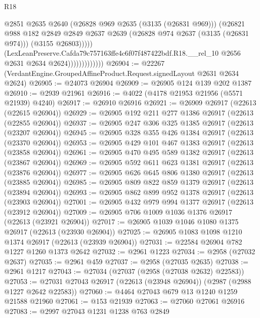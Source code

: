 \begin{lexlean}{R18}
\begin{coremodule}
                                  @2851
                                  @2635
                                  @2640
                                  (@26828 @969 @2635 (@3135 (@26831 @969)))
                                  (@26821
                                    @988
                                    @182
                                    @2849
                                    @2849
                                    @2637
                                    @2639
                                    (@26828 @974 @2637 (@3135 (@26831 @974)))
                                    (@3155 @26803)))))
                            (LexLeanPreserve.Cafda79c757163ffe4c6f07f487422bdf.R18.__rel_10
                              @2656
                              @2631
                              @2634
                              @2624)))))))))))))
@26904 := @22267 (VerdantEngine.GroupedAffineProduct.Request.signedLayout @2631 @2634 @2624)
@26905 := @24073 @26904
@26909 := @26905 @124 @139 @202 @1387
@26910 := @2939 @21961
@26916 := @4022 (@4178 @21953 @21956 (@5571 @21939) @4240)
@26917 := @26910 @26916
@26921 := @26909 @26917 (@22613 (@22615 @26904))
@26929 := @26905 @192 @211 @277 @1386 @26917 (@22613 (@22855 @26904))
@26937 := @26905 @247 @306 @325 @1385 @26917 (@22613 (@23207 @26904))
@26945 := @26905 @328 @355 @426 @1384 @26917 (@22613 (@23370 @26904))
@26953 := @26905 @429 @101 @467 @1383 @26917 (@22613 (@23858 @26904))
@26961 := @26905 @470 @495 @589 @1382 @26917 (@22613 (@23867 @26904))
@26969 := @26905 @592 @611 @623 @1381 @26917 (@22613 (@23876 @26904))
@26977 := @26905 @626 @645 @806 @1380 @26917 (@22613 (@23885 @26904))
@26985 := @26905 @809 @822 @859 @1379 @26917 (@22613 (@23894 @26904))
@26993 := @26905 @862 @899 @952 @1378 @26917 (@22613 (@23903 @26904))
@27001 := @26905 @432 @979 @994 @1377 @26917 (@22613 (@23912 @26904))
@27009 := @26905 @706 @1009 @1036 @1376 @26917 (@22613 (@23921 @26904))
@27017 := @26905 @1039 @1046 @1080 @1375 @26917 (@22613 (@23930 @26904))
@27025 := @26905 @1083 @1098 @1210 @1374 @26917 (@22613 (@23939 @26904))
@27031 := @22584 @26904 @782 @1227 @1260 @1373 @2642
@27032 := @2961 @1223
@27034 := @2958 (@27032 @2637)
@27035 := @2961 @459
@27037 := @2958 (@27035 @2635)
@27038 := @2961 @1217
@27043 := @27034 (@27037 (@2958 (@27038 @2632) @22583))
@27053 := @27031 @27043 @26917 (@22613 (@23948 @26904)) (@2987 (@2988 @1227 @2642 @22583))
@27060 := @4464 @27043 @679 @13 @1240 @1259 @21588 @21960
@27061 := @153 @21939
@27063 := @27060 @27061 @26916
@27083 := @2997
    @27043
    @1231
    @1238
    @763
    @2849

\end{coremodule}
\end{lexlean}
